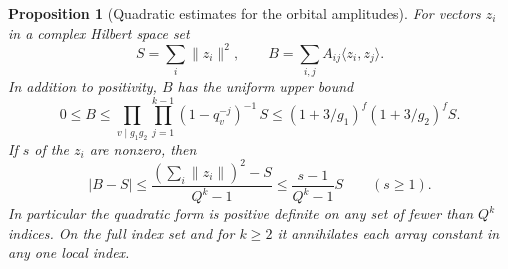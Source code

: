 \documentclass[a4paper,11pt]{article}
\newtheorem{proposition}{Proposition}[section]
\theoremstyle{definition}
\theoremstyle{remark}
\numberwithin{equation}{section}
\begin{document}
\begin{proposition}[Quadratic estimates for the orbital amplitudes]
\label{prop:amplitudes126}
For vectors \(z_i\) in a complex Hilbert space set
\[
   S=\sum_i\|z_i\|^2,\qquad
   B=\sum_{i,j}A_{ij}\langle z_i,z_j\rangle .
\]
In addition to positivity, \(B\) has the uniform upper bound
\begin{equation}
 0\le B\le
 \prod_{v\mid g_1g_2}\prod_{j=1}^{k-1}(1-q_v^{-j})^{-1}\, S
 \le (1+3/g_1)^f(1+3/g_2)^f S .
 \label{eq:spectral126}
\end{equation}
If \(s\) of the \(z_i\) are nonzero, then
\begin{equation}
 |B-S|\le\frac{(\sum_i\|z_i\|)^2-S}{Q^k-1}
                  \le\frac{s-1}{Q^k-1} S \qquad(s\ge1).
 \label{eq:sparse126}
\end{equation}
In particular the quadratic form is positive definite on any set
of fewer than \(Q^k\) indices. On the full index set and for
\(k\ge2\) it annihilates each array constant in any one local index.
\end{proposition}
\end{document}
